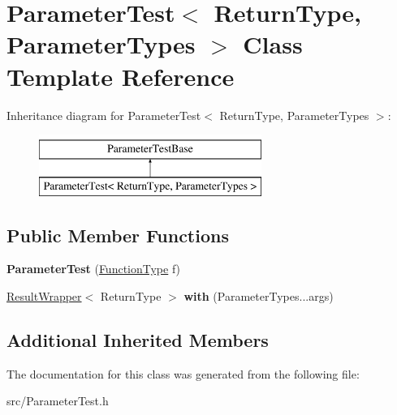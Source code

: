 \hypertarget{class_parameter_test}{\section{Parameter\-Test$<$ Return\-Type, Parameter\-Types $>$ Class Template Reference}
\label{class_parameter_test}
}
Inheritance diagram for Parameter\-Test$<$ Return\-Type, Parameter\-Types $>$\-:\begin{figure}[H]
\begin{center}
\leavevmode
\includegraphics[height=2.000000cm]{class_parameter_test}
\end{center}
\end{figure}
\subsection*{Public Member Functions}
\begin{DoxyCompactItemize}
\item 
\hypertarget{class_parameter_test_ad2e081c4df70f85ab04a5a327fcd1a7a}{{\bfseries Parameter\-Test} (\hyperlink{struct_function_type}{Function\-Type} f)}\label{class_parameter_test_ad2e081c4df70f85ab04a5a327fcd1a7a}

\item 
\hypertarget{class_parameter_test_aa67d93cda5bfc024a7d419d7d6d26b87}{\hyperlink{class_result_wrapper}{Result\-Wrapper}$<$ Return\-Type $>$ {\bfseries with} (Parameter\-Types...\-args)}\label{class_parameter_test_aa67d93cda5bfc024a7d419d7d6d26b87}

\end{DoxyCompactItemize}
\subsection*{Additional Inherited Members}


The documentation for this class was generated from the following file\-:\begin{DoxyCompactItemize}
\item 
src/Parameter\-Test.\-h\end{DoxyCompactItemize}
